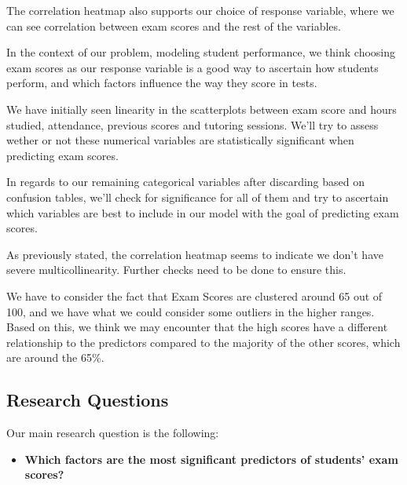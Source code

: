 \documentclass[twocolumn]{article} %
\begin{document}
The correlation heatmap also supports our choice of response variable, where we can see correlation between exam scores and the rest of the variables.

In the context of our problem, modeling student performance, we think choosing exam scores as our response variable is a good way to ascertain how students perform, and which factors influence the way they score in tests.

We have initially seen linearity in the scatterplots between exam score and hours studied, attendance, previous scores and tutoring sessions. We'll try to assess wether or not these numerical variables are statistically significant when predicting exam scores.

In regards to our remaining categorical variables after discarding based on confusion tables, we'll check for significance for all of them and try to ascertain which variables are best to include in our model with the goal of predicting exam scores.

As previously stated, the correlation heatmap seems to indicate we don't have severe multicollinearity. Further checks need to be done to ensure this.

We have to consider the fact that Exam Scores are clustered around 65 out of 100, and we have what we could consider some outliers in the higher ranges. Based on this, we think we may encounter that the high scores have a different relationship to the predictors compared to the majority of the other scores, which are around the 65\%.

\subsection*{Research Questions}

Our main research question is the following:
\begin{itemize}
  \item
\textbf{Which factors are the most significant predictors of students' exam scores?}
\end{itemize}
\end{document}
